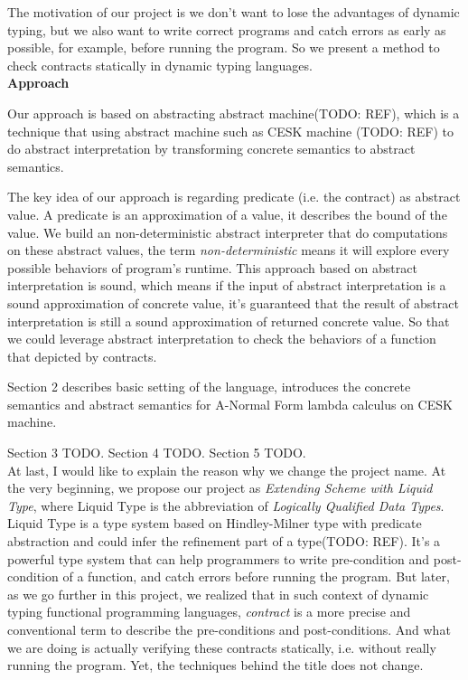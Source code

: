 \documentclass[paper=a4, fontsize=11pt]{scrartcl} %
\numberwithin{equation}{section} %
\numberwithin{figure}{section} %
\numberwithin{table}{section} %
\begin{document}
The motivation of our project is we don't want to lose the advantages of dynamic typing, but we also want to write correct programs and catch errors as early as possible, for example, before running the program. So we present a method to check contracts statically in dynamic typing languages. \\

\textbf{Approach}

Our approach is based on abstracting abstract machine(TODO: REF), which is a technique that using abstract machine such as CESK machine (TODO: REF) to do abstract interpretation by transforming concrete semantics to abstract semantics. 

The key idea of our approach is regarding predicate (i.e. the contract) as abstract value. A predicate is an approximation of a value, it describes the bound of the value. We build an non-deterministic abstract interpreter that do computations on these abstract values, the term \textit{non-deterministic} means it will explore every possible behaviors of program's runtime. This approach based on abstract interpretation is sound, which means if the input of abstract interpretation is a sound approximation of concrete value, it's guaranteed that the result of abstract interpretation is still a sound approximation of returned concrete value. So that we could leverage abstract interpretation to check the behaviors of a function that depicted by contracts.

Section 2 describes basic setting of the language, introduces the concrete semantics and abstract semantics for A-Normal Form lambda calculus on CESK machine.

Section 3 TODO. 
Section 4 TODO.
Section 5 TODO. \\

At last, I would like to explain the reason why we change the project name. At the very beginning, we propose our project as \textit{Extending Scheme with Liquid Type}, where Liquid Type is the abbreviation of \textit{Logically Qualified Data Types}. Liquid Type is a type system based on Hindley-Milner type with predicate abstraction and could infer the refinement part of a type(TODO: REF). It's a powerful type system that can help programmers to write pre-condition and post-condition of a function, and catch errors before running the program. But later, as we go further in this project, we realized that in such context of dynamic typing functional programming languages, \textit{contract} is a more precise and conventional term to describe the pre-conditions and post-conditions. And what we are doing is actually verifying these contracts statically, i.e. without really running the program. Yet, the techniques behind the title does not change.
\end{document}
